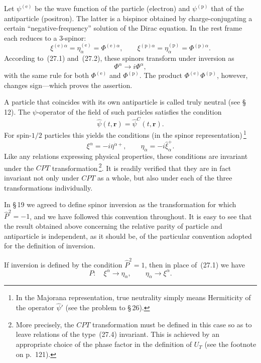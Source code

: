 Let $\psi^{(\text{e})}$ be the wave function of the particle (electron) and $\psi^{(\text{p})}$ that of the antiparticle (positron). The latter is a bispinor obtained by charge-conjugating a certain ``negative-frequency'' solution of the Dirac equation. In the rest frame each reduces to a 3-spinor:
\[
\xi^{(\text{e})\alpha} = \eta^{(\text{e})}_{\dot\alpha} = \Phi^{(\text{e})\alpha},\qquad \xi^{(\text{p})\alpha} = \eta^{(\text{p})}_{\dot\alpha} = \Phi^{(\text{p})\alpha}.
\]
According to~(27.1) and~(27.2), these spinors transform under inversion as
\begin{equation}
\Phi^\alpha \to i\Phi^\alpha,
\tag{27.3}
\end{equation}
with the same rule for both $\Phi^{(\text{e})}$ and $\Phi^{(\text{p})}$. The product $\Phi^{(\text{e})}\Phi^{(\text{p})}$, however, changes sign---which proves the assertion.

A particle that coincides with its own antiparticle is called truly neutral (see \S\,12). The $\psi$-operator of the field of such particles satisfies the condition
\[
\widehat\psi(t,\mathbf{r}) = \widehat\psi^C(t,\mathbf{r}).
\]
For spin-$1/2$ particles this yields the conditions (in the spinor representation)\,\footnote{In the Majorana representation, true neutrality simply means Hermiticity of the operator $\widehat\psi'$ (see the problem to \S\,26).}
\begin{equation}
\xi^\alpha = -i\bar\eta^{\dot\alpha+},\qquad \widehat\eta_{\dot\alpha} = -i\widehat\xi^+_\alpha.
\tag{27.4}
\end{equation}
Like any relations expressing physical properties, these conditions are invariant under the $CPT$ transformation\,\footnote{More precisely, the $CPT$ transformation must be defined in this case so as to leave relations of the type~(27.4) invariant. This is achieved by an appropriate choice of the phase factor in the definition of $U_T$ (see the footnote on p.~121).}. It is readily verified that they are in fact invariant not only under $CPT$ as a whole, but also under each of the three transformations individually.

In \S\,19 we agreed to define spinor inversion as the transformation for which $\widehat P^2 = -1$, and we have followed this convention throughout. It is easy to see that the result obtained above concerning the relative parity of particle and antiparticle is independent, as it should be, of the particular convention adopted for the definition of inversion.

If inversion is defined by the condition $\widehat P^2 = 1$, then in place of~(27.1) we have
\begin{equation}
P:\quad \xi^\alpha \to \eta_{\dot\alpha},\qquad \eta_{\dot\alpha} \to \xi^\alpha.
\tag{27.5}
\end{equation}

